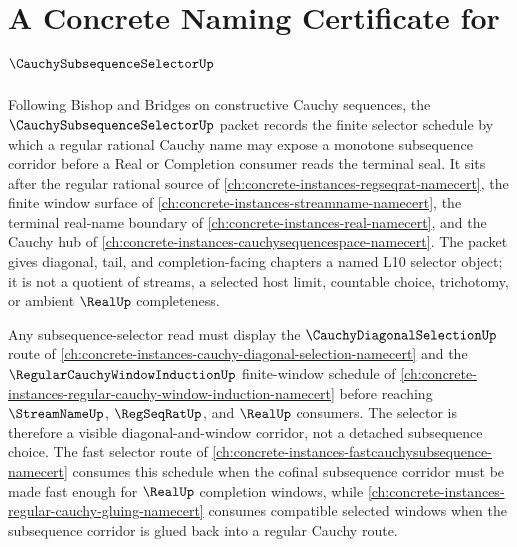 \chapter{A Concrete Naming Certificate for $\CauchySubsequenceSelectorUp$}
\label{ch:concrete-instances-cauchy-subsequence-selector-namecert}

Following Bishop and Bridges on constructive Cauchy sequences, the $\CauchySubsequenceSelectorUp$ packet records the finite selector schedule by which a regular rational Cauchy name may expose a monotone subsequence corridor before a Real or Completion consumer reads the terminal seal. It sits after the regular rational source of \autoref{ch:concrete-instances-regseqrat-namecert}, the finite window surface of \autoref{ch:concrete-instances-streamname-namecert}, the terminal real-name boundary of \autoref{ch:concrete-instances-real-namecert}, and the Cauchy hub of \autoref{ch:concrete-instances-cauchysequencespace-namecert}. The packet gives diagonal, tail, and completion-facing chapters a named L10 selector object; it is not a quotient of streams, a selected host limit, countable choice, trichotomy, or ambient $\RealUp$ completeness.

Any subsequence-selector read must display the $\CauchyDiagonalSelectionUp$ route of \autoref{ch:concrete-instances-cauchy-diagonal-selection-namecert} and the $\RegularCauchyWindowInductionUp$ finite-window schedule of \autoref{ch:concrete-instances-regular-cauchy-window-induction-namecert} before reaching $\StreamNameUp$, $\RegSeqRatUp$, and $\RealUp$ consumers. The selector is therefore a visible diagonal-and-window corridor, not a detached subsequence choice. The fast selector route of \autoref{ch:concrete-instances-fastcauchysubsequence-namecert} consumes this schedule when the cofinal subsequence corridor must be made fast enough for $\RealUp$ completion windows, while \autoref{ch:concrete-instances-regular-cauchy-gluing-namecert} consumes compatible selected windows when the subsequence corridor is glued back into a regular Cauchy route.


